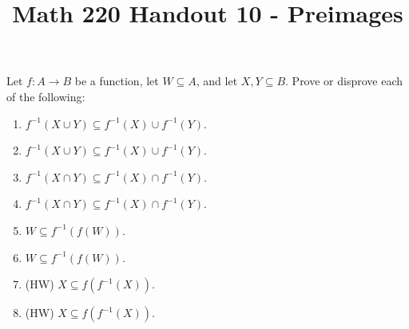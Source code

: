 \documentclass[12pt, reqno]{amsart}
\begin{document}
\title[Math 220 Handout 10 - Preimages]{Math 220 Handout 10  - Preimages}\maketitle


  Let $f\colon A \to B$ be a function, let $W \subseteq A$, and let $X,Y \subseteq B$. Prove
  or disprove each of the following:  
\begin{enumerate}
  \item $f^{-1}(X \cup Y) \subseteq f^{-1}(X) \cup f^{-1}(Y)$.
  \item $f^{-1}(X \cup Y) \subseteq f^{-1}(X) \cup f^{-1}(Y)$.
  \item $f^{-1}(X \cap Y) \subseteq f^{-1}(X) \cap f^{-1}(Y)$.
  \item $f^{-1}(X \cap Y) \subseteq f^{-1}(X) \cap f^{-1}(Y)$.
  \item $W \subseteq f^{-1}(f(W))$.
  \item $W \subseteq f^{-1}(f(W))$.
  \item (HW) $X \subseteq f(f^{-1}(X))$.
  \item (HW) $X \subseteq f(f^{-1}(X))$.
\end{enumerate}  
\end{document}
